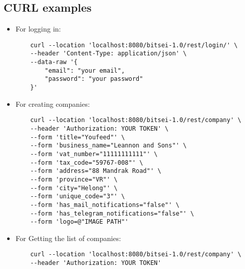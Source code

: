 \subsection{CURL examples}
\begin{itemize}
    \item For logging in:
    \begin{lstlisting}
    curl --location 'localhost:8080/bitsei-1.0/rest/login/' \
    --header 'Content-Type: application/json' \
    --data-raw '{
        "email": "your email",
        "password": "your password"
    }'
    \end{lstlisting}
    \item For creating companies:
    \begin{lstlisting}
    curl --location 'localhost:8080/bitsei-1.0/rest/company' \
    --header 'Authorization: YOUR TOKEN' \
    --form 'title="Youfeed"' \
    --form 'business_name="Leannon and Sons"' \
    --form 'vat_number="11111111111"' \
    --form 'tax_code="59767-008"' \
    --form 'address="88 Mandrak Road"' \
    --form 'province="VR"' \
    --form 'city="Helong"' \
    --form 'unique_code="3"' \
    --form 'has_mail_notifications="false"' \
    --form 'has_telegram_notifications="false"' \
    --form 'logo=@"IMAGE PATH"'
    \end{lstlisting}
    \item For Getting the list of companies:
    \begin{lstlisting}
    curl --location 'localhost:8080/bitsei-1.0/rest/company' \
    --header 'Authorization: YOUR TOKEN'
    \end{lstlisting}
\end{itemize}
